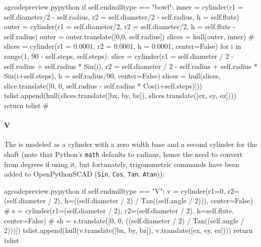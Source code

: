 \documentclass{ltxdoc}
\begin{document}
\lstset{firstnumber=\thegcpy}
\begin{writecode}{a}{gcodepreview.py}{python}
        if self.endmilltype == "bowl":
            inner = cylinder(r1 = self.diameter/2 - self.radius, r2 = self.diameter/2 - self.radius, h = self.flute)
            outer = cylinder(r1 = self.diameter/2, r2 = self.diameter/2, h = self.flute - self.radius)
            outer = outer.translate([0,0, self.radius])
            slices = hull(outer, inner)
#    slices = cylinder(r1 = 0.0001, r2 = 0.0001, h = 0.0001, center=False)
            for i in range(1, 90 - self.steps, self.steps):
                slice = cylinder(r1 = self.diameter / 2 - self.radius + self.radius * Sin(i), r2 = self.diameter / 2 - self.radius + self.radius * Sin(i+self.steps), h = self.radius/90, center=False)
                slices = hull(slices, slice.translate([0, 0, self.radius - self.radius * Cos(i+self.steps)]))
            tslist.append(hull(slices.translate([bx, by, bz]), slices.translate([ex, ey, ez])))
            return tslist
#
\end{writecode}
\addtocounter{gcpy}{12}

\paragraph{V}

The  is modeled as a cylinder with a zero width base and a second cylinder for the shaft (note that Python's \verb|math| defaults to radians, hence the need to convert from degrees if using it, but fortunately, trigonometric commands have been added to OpenPythonSCAD (\verb|Sin|, \verb|Cos|, \verb|Tan|, \verb|Atan|)):

%

\lstset{firstnumber=\thegcpy}
\begin{writecode}{a}{gcodepreview.py}{python}
        if self.endmilltype == "V":
            v = cylinder(r1=0, r2=(self.diameter / 2), h=((self.diameter / 2) / Tan((self.angle / 2))), center=False)
#                s = cylinder(r1=(self.diameter / 2), r2=(self.diameter / 2), h=self.flute, center=False)
#                sh = s.translate([0, 0, ((self.diameter / 2) / Tan((self.angle / 2)))])
            tslist.append(hull(v.translate([bx, by, bz]), v.translate([ex, ey, ez])))
            return tslist

\end{writecode}
\addtocounter{gcpy}{7}
\end{document}
